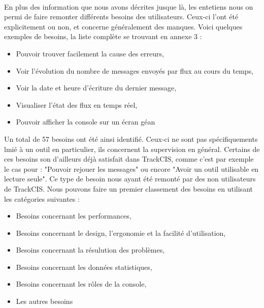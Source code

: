 			\paragraph{}%
			En plus des information que nous avons décrites jusque là, les entetiens nous
			on permi de faire remonter différents besoins des utilisateurs. Ceux-ci l'ont
			été explicitement ou non, et concerne généralement des manques. Voici
			quelques exemples de besoins, la liste complète se trouvant en annexe 3 :
			\begin{itemize}
			  \item Pouvoir trouver facilement la cause des erreurs,
			  \item Voir l'évolution du nombre de messages envoyés par flux au cours du
			  temps,
			  \item Voir la date et heure d'écriture du dernier message,
			  \item Visualiser l'état des flux en temps réel,
			  \item Pouvoir afficher la console sur un écran géan
			\end{itemize}
			Un total de 57 besoins ont été ainsi identifié. Ceux-ci ne sont pas
			spécifiquements lmié à un outil en particulier, ils concernent la supervision
			en général. Certains de ces besoins son d'ailleurs déjà satisfait dans
			TrackCIS, comme c'est par exemple le cas pour : "Pouvoir rejouer les
			messages" ou encore "Avoir un outil utilisable en lecture seule". Ce type de
			besoin nous ayant été remonté par des non utilisateurs de TrackCIS. Nous
			pouvons faire un premier classement des besoins en utilisant les catégories
			suivantes :
			\begin{itemize}
			  \item Besoins concernant les performances,
			  \item Besoins concernant le design, l'ergonomie et la facilité
			  d'utilisation,
			  \item Besoins concernant la résulution des problèmes,
			  \item Besoins concernant les données statistiques,
			  \item Besoins concernant les rôles de la console,
			  \item Les autres besoins
			\end{itemize}
			
			\paragraph{}%
	
